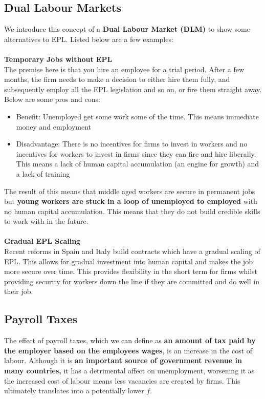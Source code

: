 \documentclass[12pt, letterpaper]{article}
\begin{document}
\subsection{Dual Labour Markets}
We introduce this concept of a \textbf{Dual Labour Market (DLM)} to show some alternatives to EPL. Listed below are a few examples:\\\\
\textbf{Temporary Jobs without EPL}\\
The premise here is that you hire an employee for a trial period. After a few months, the firm needs to make a decision to either hire them fully, and subsequently employ all the EPL legislation and so on, or fire them straight away. Below are some pros and cons:
\begin{itemize}
	\item Benefit: Unemployed get some work some of the time. This means immediate money and employment
	\item Disadvantage: There is no incentives for firms to invest in workers and no incentives for workers to invest in firms since they can fire and hire liberally. This means a lack of human capital accumulation (an engine for growth) and a lack of training
\end{itemize}
The result of this means that middle aged workers are secure in permanent jobs but \textbf{young workers are stuck in a loop of unemployed to employed} with no human capital accumulation. This means that they do not build credible skills to work with in the future.\\\\
\textbf{Gradual EPL Scaling}\\
Recent reforms in Spain and Italy build contracts which have a gradual scaling of EPL. This allows for gradual investment into human capital and makes the job more secure over time. This provides flexibility in the short term for firms whilst providing security for workers down the line if they are committed and do well in their job.

\subsection{Payroll Taxes}
The effect of payroll taxes, which we can define as \textbf{an amount of tax paid by the employer based on the employees wages}, is an increase in the cost of labour. Although it is \textbf{an important source of government revenue in many countries,} it has a detrimental affect on unemployment, worsening it as the increased cost of labour means less vacancies are created by firms. This ultimately translates into a potentially lower $f$.
\end{document}
